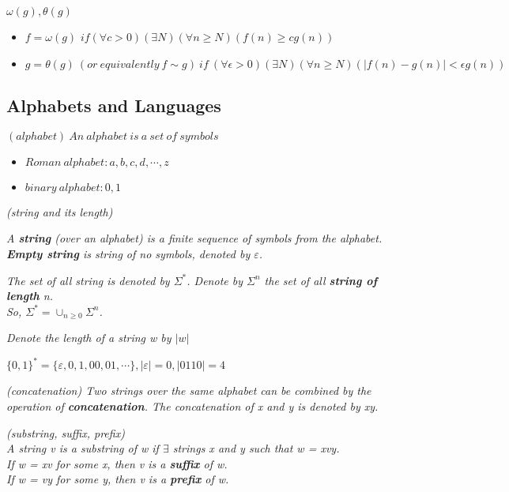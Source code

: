 \documentclass{article}
\begin{document}
\begin{defn}
    $\omega(g),\theta(g)$
    \begin{itemize}
        \item $f=\omega(g)$ $if(\forall c>0)(\exists N)(\forall n\geq N)(f(n)\geq cg(n))$
        \item $g=\theta(g) ~(or ~ equivalently ~ f \sim g) ~ if ~ (\forall \epsilon > 0)(\exists N)(\forall n \geq N)(|f(n) - g(n)| < \epsilon g(n))$
    \end{itemize}
\end{defn}
\subsection{Alphabets and Languages}
\begin{defn}
    $(alphabet)~ An ~ alphabet ~ is ~ a ~set ~ of ~ symbols$
    \begin{itemize}
        \item $Roman~alphabet:a,b,c,d,\cdots,z$
        \item $binary~alphabet:0,1$
    \end{itemize}
\end{defn}
\begin{defn}
    \textit{(string and its length)}

    \textit{A \textbf{string} (over an alphabet) is a finite sequence of symbols from the alphabet.\\ \textbf{Empty string} is string of no symbols, denoted by $\varepsilon$.}
    
    \textit{The set of all string is denoted by $\Sigma ^ *$. Denote by $\Sigma^n$ the set of all \textbf{string of length} n. \\So, $\Sigma^* = \cup_{n\geq 0}\Sigma^n$.}

    \textit{Denote the length of a string w by $|w|$}
\end{defn}

\begin{example}
    $\{0,1\}^*=\{\varepsilon,0,1,00,01,\cdots\},|\varepsilon|=0,|0110|=4$    
\end{example}

\begin{defn}
    \textit{(concatenation) Two strings over the same alphabet can be combined by the operation of \textbf{concatenation}. The concatenation of x and y is denoted by xy.}
\end{defn}

\begin{defn}
    \textit{(substring, suffix, prefix) \\A string v is a substring of w if $\exists$ strings x and y such that w = xvy.\\ \indent If w = xv for some x, then v is a \textbf{suffix} of w.\\ \indent If w = vy for some y, then v is a \textbf{prefix} of w.}
\end{defn}
\end{document}

